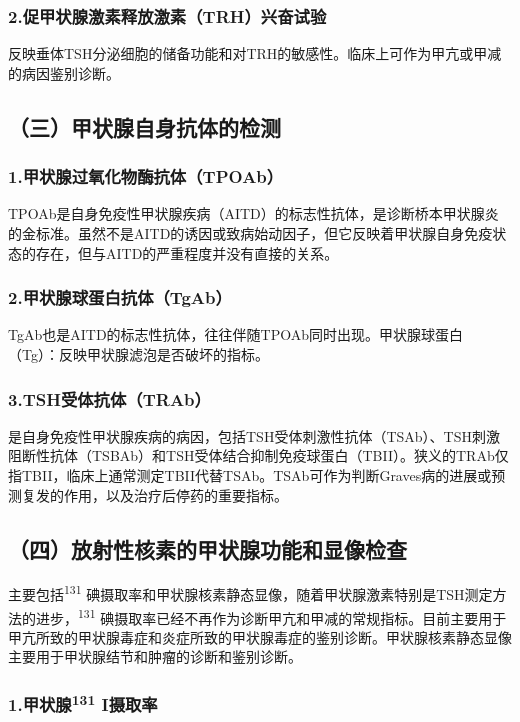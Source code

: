 \subsubsection{2.促甲状腺激素释放激素（TRH）兴奋试验}

反映垂体TSH分泌细胞的储备功能和对TRH的敏感性。临床上可作为甲亢或甲减的病因鉴别诊断。

\subsection{（三）甲状腺自身抗体的检测}

\subsubsection{1.甲状腺过氧化物酶抗体（TPOAb）}

TPOAb是自身免疫性甲状腺疾病（AITD）的标志性抗体，是诊断桥本甲状腺炎的金标准。虽然不是AITD的诱因或致病始动因子，但它反映着甲状腺自身免疫状态的存在，但与AITD的严重程度并没有直接的关系。

\subsubsection{2.甲状腺球蛋白抗体（TgAb）}

TgAb也是AITD的标志性抗体，往往伴随TPOAb同时出现。甲状腺球蛋白（Tg）：反映甲状腺滤泡是否破坏的指标。

\subsubsection{3.TSH受体抗体（TRAb）}

是自身免疫性甲状腺疾病的病因，包括TSH受体刺激性抗体（TSAb）、TSH刺激阻断性抗体（TSBAb）和TSH受体结合抑制免疫球蛋白（TBII）。狭义的TRAb仅指TBII，临床上通常测定TBII代替TSAb。TSAb可作为判断Graves病的进展或预测复发的作用，以及治疗后停药的重要指标。

\subsection{（四）放射性核素的甲状腺功能和显像检查}

主要包括\textsuperscript{131}
碘摄取率和甲状腺核素静态显像，随着甲状腺激素特别是TSH测定方法的进步，\textsuperscript{131}
碘摄取率已经不再作为诊断甲亢和甲减的常规指标。目前主要用于甲亢所致的甲状腺毒症和炎症所致的甲状腺毒症的鉴别诊断。甲状腺核素静态显像主要用于甲状腺结节和肿瘤的诊断和鉴别诊断。

\subsubsection{1.甲状腺\textsuperscript{131} I摄取率}

